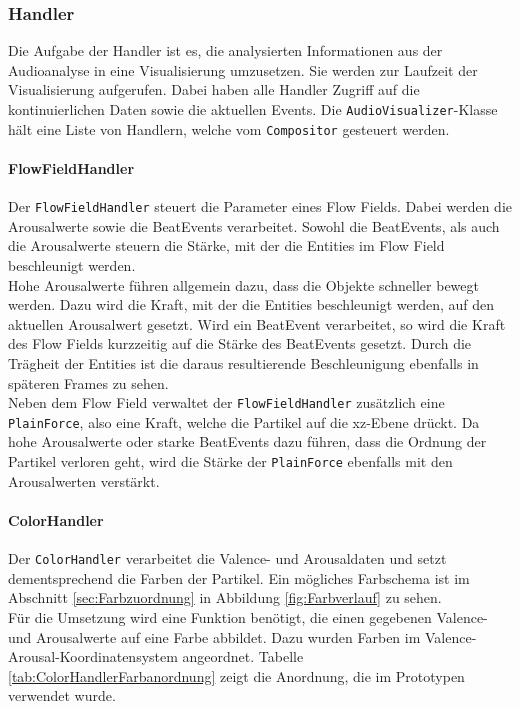 \documentclass[11pt,a4paper]{article}
\begin{document}
\newpage
\subsubsection{Handler}
Die Aufgabe der Handler ist es, die analysierten Informationen aus der Audioanalyse in eine Visualisierung umzusetzen. Sie werden zur Laufzeit der Visualisierung aufgerufen. Dabei haben alle Handler Zugriff auf die kontinuierlichen Daten sowie die aktuellen Events. Die \lstinline!AudioVisualizer!-Klasse hält eine Liste von Handlern, welche vom \lstinline!Compositor! gesteuert werden.

\paragraph{FlowFieldHandler}
Der \lstinline!FlowFieldHandler! steuert die Parameter eines Flow Fields. Dabei werden die Arousalwerte sowie die BeatEvents verarbeitet. Sowohl die BeatEvents, als auch die Arousalwerte steuern die Stärke, mit der die Entities im Flow Field beschleunigt werden.\\
Hohe Arousalwerte führen allgemein dazu, dass die Objekte schneller bewegt werden. Dazu wird die Kraft, mit der die Entities beschleunigt werden, auf den aktuellen Arousalwert gesetzt. Wird ein BeatEvent verarbeitet, so wird die Kraft des Flow Fields kurzzeitig auf die Stärke des BeatEvents gesetzt. Durch die Trägheit der Entities ist die daraus resultierende Beschleunigung ebenfalls in späteren Frames zu sehen.\\
Neben dem Flow Field verwaltet der \lstinline!FlowFieldHandler! zusätzlich eine \lstinline!PlainForce!, also eine Kraft, welche die Partikel auf die xz-Ebene drückt. Da hohe Arousalwerte oder starke BeatEvents dazu führen, dass die Ordnung der Partikel verloren geht, wird die Stärke der \lstinline!PlainForce! ebenfalls mit den Arousalwerten verstärkt.

\paragraph{ColorHandler}
Der \lstinline!ColorHandler! verarbeitet die Valence- und Arousaldaten und setzt dementsprechend die Farben der Partikel. Ein mögliches Farbschema ist im Abschnitt \ref{sec:Farbzuordnung} in Abbildung \ref{fig:Farbverlauf} zu sehen.\\
Für die Umsetzung wird eine Funktion benötigt, die einen gegebenen Valence- und Arousalwerte auf eine Farbe abbildet. Dazu wurden Farben im Valence-Arousal-Koordinatensystem angeordnet. Tabelle \ref{tab:ColorHandlerFarbanordnung} zeigt die Anordnung, die im Prototypen verwendet wurde.
\end{document}
